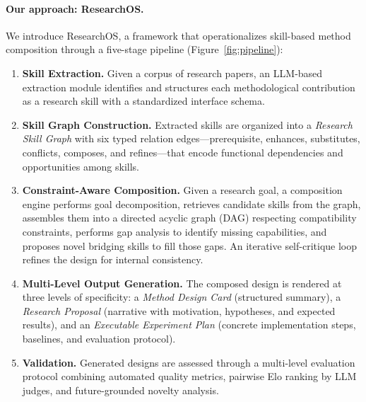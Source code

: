 \paragraph{Our approach: ResearchOS.}
We introduce ResearchOS, a framework that operationalizes skill-based method
composition through a five-stage pipeline (Figure~\ref{fig:pipeline}):
%
\begin{enumerate}[nosep,leftmargin=*]
  \item \textbf{Skill Extraction.} Given a corpus of research papers, an LLM-based extraction module identifies and structures each methodological
  contribution as a research skill with a standardized interface schema.
  \item \textbf{Skill Graph Construction.} Extracted skills are organized into
  a \emph{Research Skill Graph} with six typed relation edges---prerequisite,
  enhances, substitutes, conflicts, composes, and refines---that encode
  functional dependencies and opportunities among skills.
  \item \textbf{Constraint-Aware Composition.} Given a research goal, a
  composition engine performs goal decomposition, retrieves candidate skills
  from the graph, assembles them into a directed acyclic graph (DAG)
  respecting compatibility constraints, performs gap analysis to identify
  missing capabilities, and proposes novel bridging skills to fill those gaps.
  An iterative self-critique loop refines the design for internal consistency.
  \item \textbf{Multi-Level Output Generation.} The composed design is
  rendered at three levels of specificity: a \emph{Method Design Card}
  (structured summary), a \emph{Research Proposal} (narrative with
  motivation, hypotheses, and expected results), and an \emph{Executable
  Experiment Plan} (concrete implementation steps, baselines, and evaluation
  protocol).
  \item \textbf{Validation.} Generated designs are assessed through a
  multi-level evaluation protocol combining automated quality metrics,
  pairwise Elo ranking by LLM judges, and future-grounded novelty analysis.
\end{enumerate}

